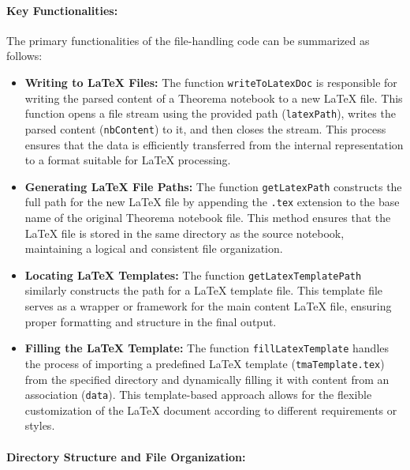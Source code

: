 \paragraph{Key Functionalities:}

The primary functionalities of the file-handling code can be summarized as follows:

\begin{itemize}
    \item \textbf{Writing to LaTeX Files:} The function \texttt{writeToLatexDoc} is responsible for writing the parsed content of a Theorema notebook to a new LaTeX file. This function opens a file stream using the provided path (\texttt{latexPath}), writes the parsed content (\texttt{nbContent}) to it, and then closes the stream. This process ensures that the data is efficiently transferred from the internal representation to a format suitable for LaTeX processing.

    \item \textbf{Generating LaTeX File Paths:} The function \texttt{getLatexPath} constructs the full path for the new LaTeX file by appending the \texttt{.tex} extension to the base name of the original Theorema notebook file. This method ensures that the LaTeX file is stored in the same directory as the source notebook, maintaining a logical and consistent file organization.

    \item \textbf{Locating LaTeX Templates:} The function \texttt{getLatexTemplatePath} similarly constructs the path for a LaTeX template file. This template file serves as a wrapper or framework for the main content LaTeX file, ensuring proper formatting and structure in the final output.

    \item \textbf{Filling the LaTeX Template:} The function \texttt{fillLatexTemplate} handles the process of importing a predefined LaTeX template (\texttt{tmaTemplate.tex}) from the specified directory and dynamically filling it with content from an association (\texttt{data}). This template-based approach allows for the flexible customization of the LaTeX document according to different requirements or styles.
\end{itemize}

\paragraph{Directory Structure and File Organization:}

